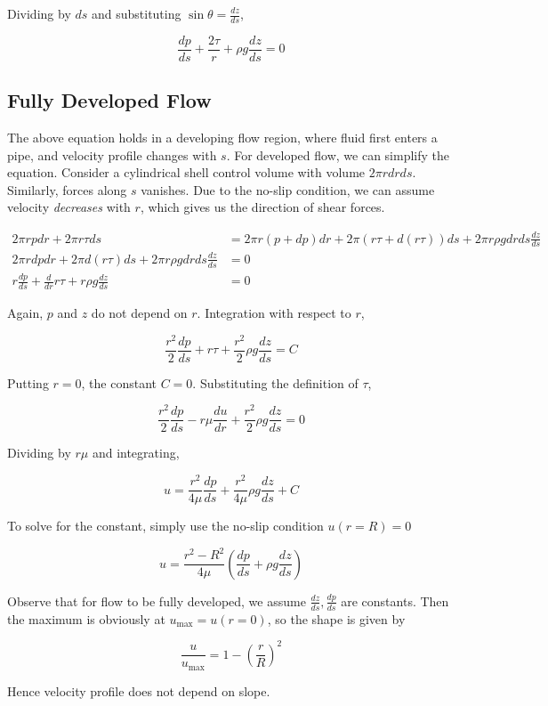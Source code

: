 \documentclass[12pt]{article}
\begin{document}
Dividing by $ds$ and substituting $\sin\theta = \frac{dz}{ds}$,

\begin{equation}
    \frac{dp}{ds} + \frac{2\tau}{r} + \rho g \frac{dz}{ds} = 0
\end{equation}

\subsection{Fully Developed Flow}

The above equation holds in a developing flow region, where fluid first enters a pipe, and velocity profile changes with $s$. For developed flow, we can simplify the equation. Consider a cylindrical shell control volume with volume $2\pi rdrds$. Similarly, forces along $s$ vanishes. Due to the no-slip condition, we can assume velocity \textit{decreases} with $r$, which gives us the direction of shear forces.

\begin{align*}
    2\pi rpdr + 2\pi r\tau ds &= 2\pi r(p + dp)dr + 2\pi (r\tau + d(r\tau)) ds + 2\pi r\rho g drds \frac{dz}{ds} \\
    2\pi rdpdr + 2\pi d(r\tau)ds + 2\pi r\rho g drds \frac{dz}{ds} &= 0 \\
    r \frac{dp}{ds} + \frac{d}{dr} r\tau + r\rho g \frac{dz}{ds} &= 0
\end{align*}

Again, $p$ and $z$ do not depend on $r$. Integration with respect to $r$,

$$\frac{r^2}{2} \frac{dp}{ds} + r\tau + \frac{r^2}{2} \rho g \frac{dz}{ds} = C$$

Putting $r=0$, the constant $C=0$. Substituting the definition of $\tau$,

$$\frac{r^2}{2} \frac{dp}{ds} - r\mu \frac{du}{dr} + \frac{r^2}{2} \rho g \frac{dz}{ds} = 0$$

Dividing by $r\mu$ and integrating,

$$u = \frac{r^2}{4\mu} \frac{dp}{ds} + \frac{r^2}{4\mu} \rho g \frac{dz}{ds} + C$$

To solve for the constant, simply use the no-slip condition $u(r=R) = 0$

\begin{equation}
    u = \frac{r^2-R^2}{4\mu} \left(\frac{dp}{ds} + \rho g \frac{dz}{ds}\right)
\end{equation}

Observe that for flow to be fully developed, we assume $\frac{dz}{ds}, \frac{dp}{ds}$ are constants. Then the maximum is obviously at $u_{\text{max}} = u(r=0)$, so the shape is given by

$$\frac{u}{u_{\text{max}}} = 1 - \left(\frac{r}{R}\right)^2$$

Hence velocity profile does not depend on slope.
\end{document}
